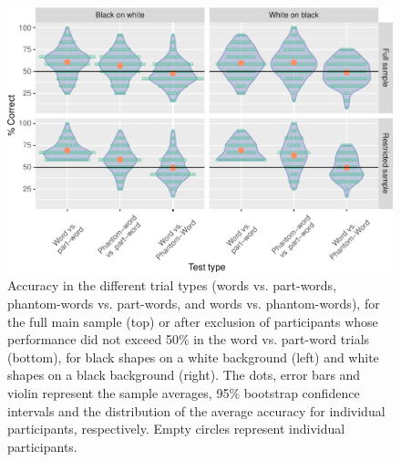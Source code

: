\documentclass[
]{article}
\begin{document}
\begin{figure}

{\centering \includegraphics[width=0.8\linewidth]{vsl_phamtoms_simultaneous_results_files/figure-latex/vsl-simultaneous-fa-plot-accuracy-plot-by-polarity-testable-1} 

}

\caption{Accuracy in the different trial types (words vs. part-words, phantom-words vs. part-words, and words vs. phantom-words), for the full main sample (top) or after exclusion of participants whose performance did not exceed 50\% in the word vs. part-word trials (bottom), for black shapes on a white background (left) and white shapes on a black background (right). The dots, error bars and violin represent the sample averages, 95\% bootstrap confidence intervals and the distribution of the average accuracy for individual participants, respectively. Empty circles represent individual participants.}\label{fig:vsl-simultaneous-fa-plot-accuracy-plot-by-polarity-testable}
\end{figure}
\end{document}
